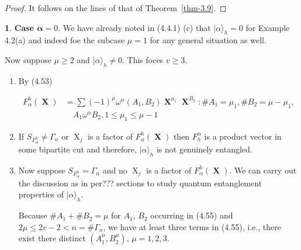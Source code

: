 \documentclass[a4paper,12pt]{article}
\DeclareMathOperator{\x}{\mathrm{X}}
\theoremstyle{definition}
\theoremstyle{underlinethm}
\theoremstyle{definition}
\newtheorem{subsubsec}{}[subsection]
\begin{document}
\begin{proof}
It follows on the lines of that of Theorem~\eqref{thm-3.9}.
\end{proof}

\begin{subsubsec}\label{subsubsection-4.4.2}
\textbf{Case $\boldsymbol{\alpha} =0$}. We have already noted in (4.4.1) (c) that $| \alpha \rangle_{h} = 0$ for Example 4.2(a) and indeed foe the subcase $\mu=1$ for any general situation as well.

Now suppose $\mu \geq 2$ and $| \alpha \rangle_{h} \neq 0$. This foces $v \geq 3$.

\end{subsubsec}

\begin{enumerate}[label=(\alph*)]

\item By (4.53)

\begin{align*}
F_{\alpha}^{h}(\boldsymbol{\x}) &= \sum (-1)^{\mu} \omega^{\alpha}(A_{1}, B_{2}) \boldsymbol{\x}^{a_{1}} \boldsymbol{\x}^{B_{2}} : \# A_{1} = \mu_{1}, \# B_{2} = \mu-\mu_{1},\\
&\quad A_{1}\omega^{\alpha} B_{2}, 1 \leq \mu_{1} \leq \mu-1\tag{4.55}\label{eq-4.55} 
\end{align*}

\item If $S_{F^{h}_{\alpha}} \neq \Gamma_{n}$ or $\x_{j}$ is a factor of $F_{\alpha}^{h}(\boldsymbol{\x})$ then $F_{h}^{\alpha}$ is a product vector in some bipartite cut and therefore, $| \alpha \rangle_{h}$ is not genuinely entangled. 

\item Now suppose $S_{F_{\alpha}^{h}}= \Gamma_{n}$ and no $\x_{j}$ is a factor of $F_{\alpha}^{h}(\boldsymbol{\x})$. We can carry out the discussion as in per??? sections to study quantum entanglement properties of $| \alpha \rangle_{h}$.

Because $\# A_{1} + \# B_{2} = \mu$ for $A_{1}$, $B_{2}$ occurring in (4.55) and $2\mu \leq 2v-2 < n = \# \Gamma_{n}$, we have at least three terms in (4.55), i.e., there exist there distinct $(A_{1}^{\mu}, B_{2}^{\mu})$, $\mu= 1,2,3$.
\end{enumerate}
\end{document}

